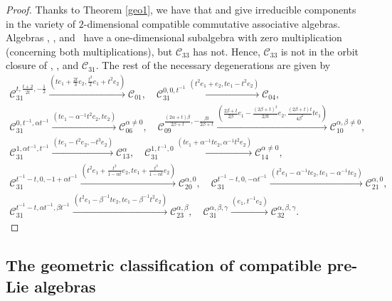 \documentclass[pdftex]{sigma}
\numberwithin{equation}{section}
\begin{document}
\begin{proof}
Thanks to Theorem \ref{geo1}, we have that
 and  give irreducible components in the variety of $2$-dimensional compatible commutative associative algebras.
Algebras ,
, and~ have a one-dimensional subalgebra with zero multiplication (concerning both multiplications), but $\mathcal{C}_{33}$ has not.
Hence, $\mathcal{C}_{33}$ is not in the orbit closure of ,
, and $\mathcal{C}_{31}.$
The rest of the necessary degenerations are given by
\begin{gather*}
 \mathcal{C}_{31}^{t, \frac{t+2}{2t}, -\frac{1}{2}} \xrightarrow{ ( te_1+\frac{2 t}{3}e_2, \frac{t^2}{2}e_1+t^2e_2)} \mathcal{C}_{01} , \quad
 \mathcal{C}_{31}^{0, 0, t^{-1}} \xrightarrow{ ( t^2e_1+e_2, te_1-t^2e_2)} \mathcal{C}_{04} , \\
 \mathcal{C}_{31}^{0, t^{-1}, \alpha t^{-1}} \xrightarrow{ ( te_1-\alpha^{-1}t^2e_2, te_2)} \mathcal{C}_{06}^{\alpha\neq0} , \quad
 \mathcal{C}_{09}^{\frac{(2\alpha+t)\beta}{2\beta+t},-\frac{\beta t}{2\beta+t}} \xrightarrow{ ( \frac{2\beta +t}{2\beta}e_1-\frac{(2\beta +t)^2}{2\beta t}e_2, \frac{(2\beta+t)t}{4\beta^2}te_1)} \mathcal{C}_{10}^{\alpha,\beta\neq0} ,\\
 \mathcal{C}_{31}^{1, \alpha t^{-1}, t^{-1}} \xrightarrow{ ( te_1-t^2e_2, -t^3e_2)} \mathcal{C}_{13}^{\alpha} , \quad
 \mathcal{C}_{31}^{1, t^{-1}, 0} \xrightarrow{ (te_1+\alpha^{-1} t e_2, \alpha^{-1}t^2 e_2)} \mathcal{C}_{14}^{\alpha\neq0} , \\
 \mathcal{C}_{31}^{t^{-1}-t, 0, -1+\alpha t^{-1}} \xrightarrow{ (t^2e_1+\frac{t^2}{1-\alpha t} e_2, t e_1+\frac{t^3}{1-\alpha t} e_2)} \mathcal{C}_{20}^{\alpha,0} ,\quad
 \mathcal{C}_{31}^{t^{-1}-t, 0, -\alpha t^{-1}} \xrightarrow{ (t^2e_1-\alpha^{-1} t e_2, t e_1- \alpha^{-1} t e_2)} \mathcal{C}_{21}^{\alpha,0} , \\
 \mathcal{C}_{31}^{t^{-1}-t, \alpha t^{-1}, \beta t^{-1}} \xrightarrow{ (t^2e_1-\beta^{-1} t e_2, t e_1- \beta^{-1} t^2 e_2)} \mathcal{C}_{23}^{\alpha,\beta} , \quad
 \mathcal{C}_{31}^{\alpha, \beta, \gamma} \xrightarrow{ ( e_1, t^{-1}e_2)} \mathcal{C}_{32}^{\alpha, \beta, \gamma}. \tag*{\qed}
\end{gather*}\renewcommand{\qed}{}
\end{proof}

\subsection{The geometric classification of compatible pre-Lie algebras}
\end{document}

